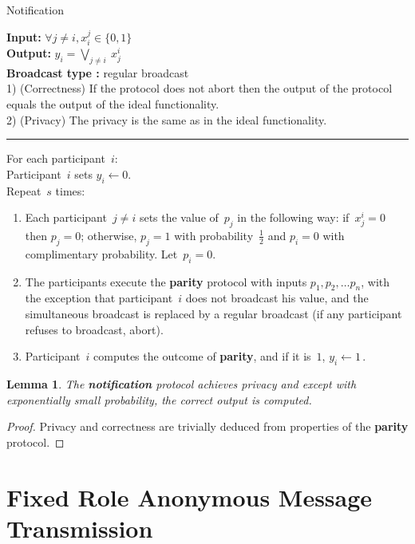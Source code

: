 \documentclass[11pt]{article}
\newtheorem{lemma}[theorem]{Lemma}
\begin{document}
\begin{protocol} \caption{Notification} \label{prot:notification}
{\bf Input:} $\forall j \neq i, x^j_i \in \{0,1\}$ \\
{\bf Output:} $y_i=\bigvee_{j \neq i}  \ x_j^i$ \\
{\bf Broadcast type :}  regular broadcast\\
1) (Correctness) If the protocol does not abort then the output of
the protocol
equals the output of the ideal functionality.   \\
2) (Privacy) The privacy is the same as in the ideal functionality.

\vspace{4pt} \hrule \vspace{4pt}


For each participant~$i$:\\
\phantom{----}Participant~$i$ sets $y_i \leftarrow 0$.\\
\phantom{----}Repeat~$s$ times:
\begin{enumerate}
\item Each participant~$j \neq i$ sets the value of~$p_j$ in the
following way: if~$x_j^i=0$ then $p_j=0$; otherwise, $p_j=1$ with
probability~$\frac{1}{2}$ and $p_i=0$ with complimentary
probability. Let~$p_i =0$.
\item The participants execute the \textbf{parity} protocol with inputs
$p_1, p_2, \ldots p_n$, with the exception that participant~$i$ does
not broadcast his value, and the simultaneous broadcast is replaced
by a regular broadcast (if any participant refuses to broadcast,
abort).
\item Participant~$i$ computes the outcome of \textbf{parity}, and if it is~$1$, $y_i \leftarrow
1$\,.
\end{enumerate}
\end{protocol}

\begin{lemma}
The \textbf{notification} protocol achieves privacy and except with
exponentially small probability, the correct output is computed.
\end{lemma}

\begin{proof}
Privacy and correctness are trivially deduced from properties of the
\textbf{parity} protocol.
\end{proof}

\section{Fixed Role Anonymous Message Transmission}
\label{sec:fr-anonymous-message}
\end{document}
